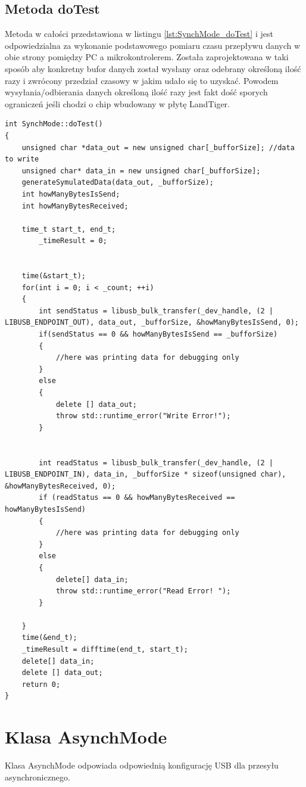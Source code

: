 \documentclass{BscUS}
\begin{document}
\subsection{Metoda doTest}
Metoda w całości przedstawiona w listingu \ref{lst:SynchMode_doTest} i jest odpowiedzialna za wykonanie podstawowego pomiaru czasu przepływu danych w obie strony pomiędzy PC a mikrokontrolerem.
\newline
Została zaprojektowana w taki sposób aby konkretny bufor danych został wysłany oraz odebrany określoną ilość razy i zwrócony przedział czasowy w jakim udało się to uzyskać. Powodem wysyłania/odbierania danych określoną ilość razy jest fakt dość sporych ograniczeń jeśli chodzi o chip wbudowany w płytę LandTiger.
\begin{lstlisting}[caption={Metoda SynchMode::doTest()},label={lst:SynchMode_doTest}]
int SynchMode::doTest()
{
	unsigned char *data_out = new unsigned char[_bufforSize]; //data to write
	unsigned char* data_in = new unsigned char[_bufforSize];
	generateSymulatedData(data_out, _bufforSize);
	int howManyBytesIsSend; 
	int howManyBytesReceived;

	time_t start_t, end_t;
    	_timeResult = 0;

	
	time(&start_t);
	for(int i = 0; i < _count; ++i)
	{
		int sendStatus = libusb_bulk_transfer(_dev_handle, (2 | LIBUSB_ENDPOINT_OUT), data_out, _bufforSize, &howManyBytesIsSend, 0); 
		if(sendStatus == 0 && howManyBytesIsSend == _bufforSize)
		{
			//here was printing data for debugging only
		}
		else
		{
			delete [] data_out;
			throw std::runtime_error("Write Error!");
		}
		
		
		int readStatus = libusb_bulk_transfer(_dev_handle, (2 | LIBUSB_ENDPOINT_IN), data_in, _bufforSize * sizeof(unsigned char), &howManyBytesReceived, 0);
		if (readStatus == 0 && howManyBytesReceived == howManyBytesIsSend) 
		{
			//here was printing data for debugging only
		} 
		else 
		{
			delete[] data_in;
			throw std::runtime_error("Read Error! ");
		}
		
	}
	time(&end_t);
	_timeResult = difftime(end_t, start_t);
	delete[] data_in;
	delete [] data_out;
	return 0;
}
\end{lstlisting}
\section{Klasa AsynchMode}
Klasa AsynchMode odpowiada odpowiednią konfigurację USB dla przesyłu asynchronicznego. 
\end{document}
